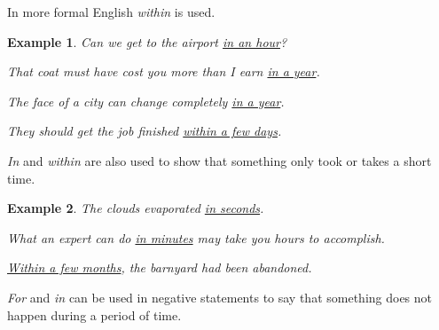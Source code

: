\documentclass[oneside]{book}
\numberwithin{equation}{section}
\newtheorem{example}{Example}[section]
\begin{document}
In more formal English \textit{within} is used.
\begin{example}
    Can we get to the airport \underline{in an hour}?
    
    That coat must have cost you more than I earn \underline{in a year}.
    
    The face of a city can change completely \underline{in a year}.
    
    They should get the job finished \underline{within a few days}.
\end{example}
%
\noindent{} \textit{In} and \textit{within} are also used to show that something only took or takes a short time.
\begin{example}
    The clouds evaporated \underline{in seconds}.
    
    What an expert can do \underline{in minutes} may take you hours to accomplish.
    
    \underline{Within a few months}, the barnyard had been abandoned.
\end{example}
%
\noindent{} \textit{For} and \textit{in} can be used in negative statements to say that something does not happen during a period of time.
\end{document}
